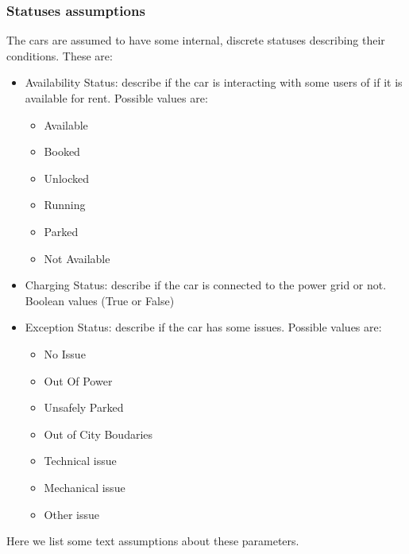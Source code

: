 \documentclass[11pt]{article} %
\begin{document}
\subsubsection{Statuses assumptions}
The cars are assumed to have some internal, discrete statuses describing their conditions. These are:
\begin{itemize}
	\item{Availability Status}: describe if the car is interacting with some users of if it is available for rent. Possible values are:
		\begin{itemize}
		\item Available
		\item Booked
		\item Unlocked
		\item Running
		\item Parked
		\item Not Available
		\end{itemize}	
	\item{Charging Status}: describe if the car is connected to the power grid or not. Boolean values (True or False)
	\item{Exception Status}: describe if the car has some issues. Possible values are:
		\begin{itemize}
		\item No Issue
		\item Out Of Power
		\item Unsafely Parked
		\item Out of City Boudaries
		\item Technical issue
		\item Mechanical issue
		\item Other issue
		\end{itemize}
\end{itemize}
Here we list some text assumptions about these parameters.
\end{document}
